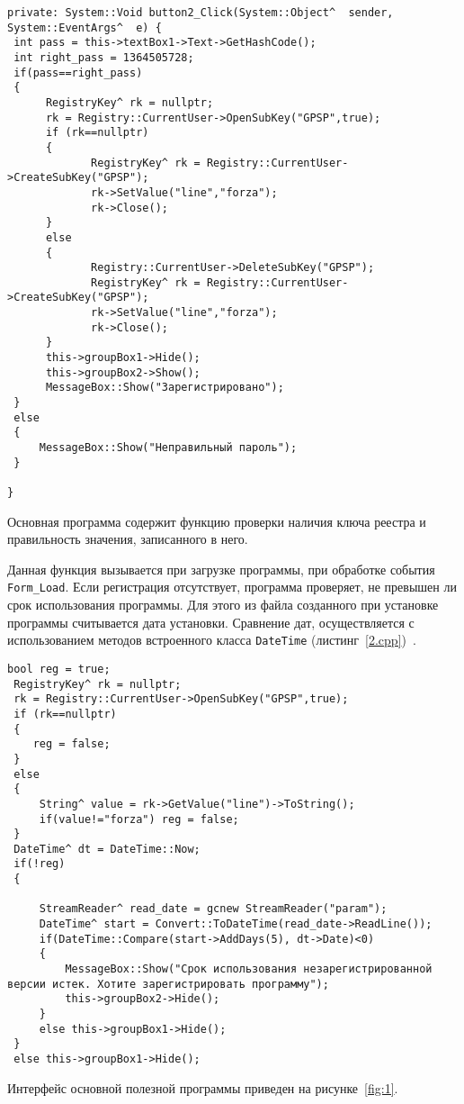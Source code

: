 \begin{lstlisting}[caption = {Функция регистрации}, label = {1.cpp}]
private: System::Void button2_Click(System::Object^  sender, System::EventArgs^  e) {
 int pass = this->textBox1->Text->GetHashCode();
 int right_pass = 1364505728; 
 if(pass==right_pass)
 {
	  RegistryKey^ rk = nullptr;
	  rk = Registry::CurrentUser->OpenSubKey("GPSP",true);
	  if (rk==nullptr)
	  {
			 RegistryKey^ rk = Registry::CurrentUser->CreateSubKey("GPSP");
			 rk->SetValue("line","forza");
			 rk->Close();
	  }					
	  else
	  {
			 Registry::CurrentUser->DeleteSubKey("GPSP");
			 RegistryKey^ rk = Registry::CurrentUser->CreateSubKey("GPSP");
			 rk->SetValue("line","forza");
			 rk->Close();
	  }
	  this->groupBox1->Hide();
	  this->groupBox2->Show();
	  MessageBox::Show("Зарегистрировано");
 }
 else
 {
	 MessageBox::Show("Неправильный пароль");
 }

} 
\end{lstlisting}

Основная программа содержит функцию проверки наличия ключа реестра и
правильность значения, записанного в него. 

Данная функция вызывается при загрузке программы, при обработке
события \texttt{Form\_Load}. Если регистрация отсутствует, программа
проверяет, не превышен ли срок использования программы. Для этого из
файла созданного при установке программы считывается дата
установки. Сравнение дат, осуществляется с использованием методов
встроенного класса \texttt{DateTime} (листинг~\ref{2.cpp})~\cite{2}.

\begin{lstlisting}[caption = {Проверка признака регистрации}, label = {2.cpp}]
 bool reg = true;
 RegistryKey^ rk = nullptr;
 rk = Registry::CurrentUser->OpenSubKey("GPSP",true);
 if (rk==nullptr)
 {
	reg = false;
 }
 else
 {
	 String^ value = rk->GetValue("line")->ToString();
	 if(value!="forza") reg = false; 
 }
 DateTime^ dt = DateTime::Now;
 if(!reg)
 {
	 
	 StreamReader^ read_date = gcnew StreamReader("param");
	 DateTime^ start = Convert::ToDateTime(read_date->ReadLine()); 
	 if(DateTime::Compare(start->AddDays(5), dt->Date)<0)
	 {
		 MessageBox::Show("Срок использования незарегистрированной версии истек. Хотите зарегистрировать программу");
		 this->groupBox2->Hide();
	 }
	 else this->groupBox1->Hide();
 }
 else this->groupBox1->Hide(); 
\end{lstlisting}

Интерфейс основной полезной программы приведен на рисунке~\ref{fig:1}.

